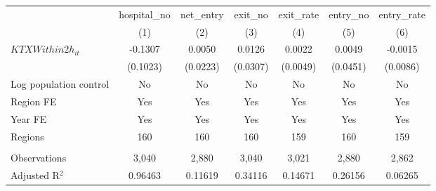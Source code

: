 \begingroup
\centering
\begin{tabular}{lcccccc}
   \toprule
                          & hospital\_no  & net\_entry  & exit\_no  & exit\_rate  & entry\_no  & entry\_rate \\    
                          & (1)           & (2)         & (3)       & (4)         & (5)        & (6)\\  
   \midrule 
   $KTXWithin2h_{it}$     & -0.1307       & 0.0050      & 0.0126    & 0.0022      & 0.0049     & -0.0015\\   
                          & (0.1023)      & (0.0223)    & (0.0307)  & (0.0049)    & (0.0451)   & (0.0086)\\   
   Log population control & No            & No          & No        & No          & No         & No\\  
   Region FE              & Yes           & Yes         & Yes       & Yes         & Yes        & Yes\\  
   Year FE                & Yes           & Yes         & Yes       & Yes         & Yes        & Yes\\  
   Regions                & 160           & 160         & 160       & 159         & 160        & 159\\  
    \\
   Observations           & 3,040         & 2,880       & 3,040     & 3,021       & 2,880      & 2,862\\  
   Adjusted R$^2$         & 0.96463       & 0.11619     & 0.34116   & 0.14671     & 0.26156    & 0.06265\\  
   \bottomrule
\end{tabular}
\par\endgroup
